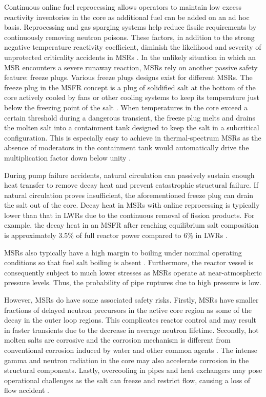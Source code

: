 Continuous online fuel reprocessing allows operators to maintain low excess
reactivity inventories in the core as additional fuel can be added on an ad
hoc basis. Reprocessing and gas sparging systems help reduce fissile
requirements by continuously removing neutron poisons. These factors, in
addition to the strong negative temperature
reactivity coefficient, diminish the likelihood and severity of unprotected
criticality accidents in \glspl{MSR} \cite{elsheikh_safety_2013}. In the
unlikely situation in which an \gls{MSR} encounters a severe runaway reaction,
\glspl{MSR} rely on another passive safety feature: freeze plugs. Various
freeze plugs designs exist for different \glspl{MSR}. The freeze plug
in the \gls{MSFR} concept is a plug of solidified salt at the bottom of the
core actively cooled by fans or other cooling systems to keep its temperature
just below the freezing point of the salt \cite{aji_experimental_2020}. When
temperatures in the core exceed a certain threshold during a
dangerous transient, the freeze plug melts and drains the molten salt
into a containment tank designed to keep the salt in a subcritical
configuration. This is especially easy to achieve in thermal-spectrum
\glspl{MSR} as the absence of moderators in the containment tank would
automatically drive the multiplication factor down below unity
\cite{elsheikh_safety_2013}.

During pump failure accidents, natural circulation can passively sustain
enough heat transfer to remove decay heat and prevent catastrophic structural
failure. If natural circulation proves insufficient, the aforementioned freeze
plug can drain the salt out of the core. Decay heat in \glspl{MSR} with online
reprocessing is typically lower than that in \glspl{LWR} due to the
continuous removal of fission products. For example, the decay heat in an
\gls{MSFR} after reaching equilibrium salt composition is approximately
3.5\% of full reactor power compared to 6\% in \glspl{LWR}
\cite{brovchenko_design-related_2013}.

\glspl{MSR} also typically have a high margin to boiling under nominal
operating conditions so that fuel salt boiling is absent
\cite{elsheikh_safety_2013}. Furthermore, the reactor vessel is consequently
subject to much lower stresses as \glspl{MSR} operate at near-atmospheric
pressure levels. Thus, the probability of pipe ruptures due to high pressure
is low.

However, \glspl{MSR} do have some associated safety risks.
Firstly, \glspl{MSR} have smaller fractions of delayed neutron precursors in
the active core region as some of the decay in the outer loop regions.
This complicates reactor control and may result in faster transients due to
the decrease in average neutron lifetime. Secondly, hot molten salts are
corrosive and the corrosion mechanism is different from conventional
corrosion induced by water and other common agents \cite{yoshioka_7_2017}. The
intense gamma and neutron radiation in the core may also accelerate corrosion
in the structural components. Lastly, overcooling in pipes and heat exchangers
may pose operational challenges as the salt can freeze and restrict flow,
causing a loss of flow accident \cite{ho_molten_2013}.

